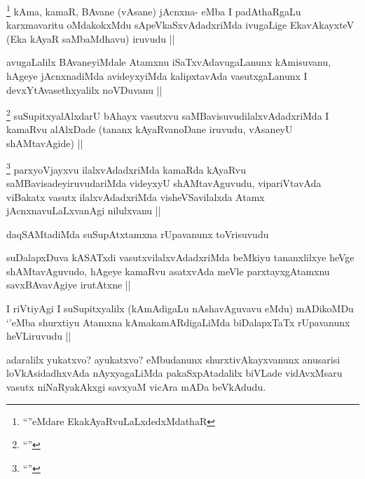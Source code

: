 
\begin{artha}
\footnote{``\stext''eMdare EkakAyaRvuLaLxdedxMdathaR}
kAma, kamaR, BAvane (vAsane) jAcnxna- eMba I padAthaRgaLu karxmavaritu oMdakokxMdu sApeVkaSxvAdadxriMda ivugaLige EkavAkayxteV (Eka kAyaR saMbaMdhavu) iruvudu ||
\end{artha}


\begin{artha}
avugaLalilx BAvaneyiMdale Atamxnu iSaTxvAdavugaLanunx kAmisuvanu, hAgeye jAcnxnadiMda avideyxyiMda kalipxtavAda vasutxgaLanunx I devxYtAvasethxyalilx noVDuvanu ||
\end{artha}

\begin{artha}
\footnote{``\stext''}
suSupitxyalAlxdarU bAhayx vasutxvu saMBavisuvudilalxvAdadxriMda I kamaRvu alAlxDade (tananx kAyaRvanoDane iruvudu, vAsaneyU shAMtavAgide) ||
\end{artha}

\begin{artha}
\footnote{``\stext''}
parxyoVjayxvu ilalxvAdadxriMda kamaRda kAyaRvu saMBavisadeyiruvudariMda videyxyU shAMtavAguvudu, vipariVtavAda viBakatx vasutx ilalxvAdadxriMda visheVSavilalxda Atamx jAcnxnavuLaLxvanAgi nilulxvanu ||
\end{artha}

\begin{artha}
daqSAMtadiMda suSupAtxtamxna rUpavanunx toVrisuvudu
\end{artha}

\begin{artha}
suDalapxDuva kASATxdi vasutxvilalxvAdadxriMda beMkiyu tananxlilxye heVge shAMtavAguvudo, hAgeye kamaRvu asatxvAda meVle parxtayxgAtamxnu savxBAvavAgiye irutAtxne ||
\end{artha}

\begin{artha}
I riVtiyAgi I suSupitxyalilx (kAmAdigaLu nAshavAguvavu eMdu) mADikoMDu `\stext'eMba shurxtiyu Atamxna kAmakamARdigaLiMda biDalapxTaTx rUpavanunx heVLiruvudu ||
\end{artha}


\begin{artha}
adaralilx yukatxvo? ayukatxvo? eMbudanunx shurxtivAkayxvanunx anusarisi loVkAsidadhxvAda nAyxyagaLiMda pakaSxpAtadalilx biVLade vidAvxMsaru vasutx niNaRyakAkxgi savxyaM vicAra mADa beVkAdudu.
\end{artha}

